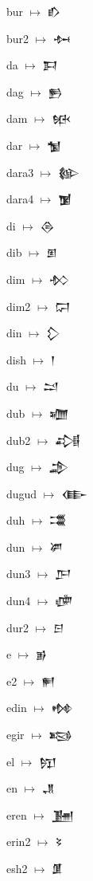 {\noindent bur $\mapsto$ {\cufont 𒁓}\par
\noindent bur2 $\mapsto$ {\cufont 𒁔}\par
\noindent da $\mapsto$ {\cufont 𒁕}\par
\noindent dag $\mapsto$ {\cufont 𒁖}\par
\noindent dam $\mapsto$ {\cufont 𒁮}\par
\noindent dar $\mapsto$ {\cufont 𒁯}\par
\noindent dara3 $\mapsto$ {\cufont 𒁰}\par
\noindent dara4 $\mapsto$ {\cufont 𒁱}\par
\noindent di $\mapsto$ {\cufont 𒁲}\par
\noindent dib $\mapsto$ {\cufont 𒁳}\par
\noindent dim $\mapsto$ {\cufont 𒁴}\par
\noindent dim2 $\mapsto$ {\cufont 𒁶}\par
\noindent din $\mapsto$ {\cufont 𒁷}\par
\noindent dish $\mapsto$ {\cufont 𒁹}\par
\noindent du $\mapsto$ {\cufont 𒁺}\par
\noindent dub $\mapsto$ {\cufont 𒁾}\par
\noindent dub2 $\mapsto$ {\cufont 𒂀}\par
\noindent dug $\mapsto$ {\cufont 𒂁}\par
\noindent dugud $\mapsto$ {\cufont 𒂂}\par
\noindent duh $\mapsto$ {\cufont 𒂃}\par
\noindent dun $\mapsto$ {\cufont 𒂄}\par
\noindent dun3 $\mapsto$ {\cufont 𒂅}\par
\noindent dun4 $\mapsto$ {\cufont 𒂈}\par
\noindent dur2 $\mapsto$ {\cufont 𒂉}\par
\noindent e $\mapsto$ {\cufont 𒂊}\par
\noindent e2 $\mapsto$ {\cufont 𒂍}\par
\noindent edin $\mapsto$ {\cufont 𒂔}\par
\noindent egir $\mapsto$ {\cufont 𒂕}\par
\noindent el $\mapsto$ {\cufont 𒂖}\par
\noindent en $\mapsto$ {\cufont 𒂗}\par
\noindent eren $\mapsto$ {\cufont 𒂞}\par
\noindent erin2 $\mapsto$ {\cufont 𒂟}\par
\noindent esh2 $\mapsto$ {\cufont 𒂠}\par
}
